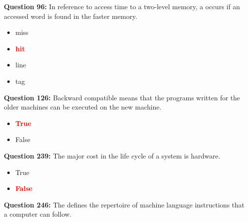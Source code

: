 \documentclass[12pt,a4paper]{article}
\begin{document}
\vspace{0.5cm}

\vspace{0.5cm}

\textbf{Question 96:} In reference to access time to a two-level memory, a \underline{\hspace{1.5cm}} occurs if an accessed word is found in the faster memory.

\begin{itemize}
    \item[\textbf{A.}] miss
    \item[\textbf{B.}] \textcolor{red}{\textbf{hit}}
    \item[\textbf{C.}] line
    \item[\textbf{D.}] tag
\end{itemize}

\vspace{0.5cm}

\vspace{0.5cm}

\textbf{Question 126:} Backward compatible means that the programs written for the older machines can be executed on the new machine.

\begin{itemize}
    \item[\textbf{A.}] \textcolor{red}{\textbf{True}}
    \item[\textbf{B.}] False
\end{itemize}

\vspace{0.5cm}

\vspace{0.5cm}

\textbf{Question 239:} The major cost in the life cycle of a system is hardware.

\begin{itemize}
    \item[\textbf{A.}] True
    \item[\textbf{B.}] \textcolor{red}{\textbf{False}}
\end{itemize}

\vspace{0.5cm}

\vspace{0.5cm}

\textbf{Question 246:} The \underline{\hspace{1.5cm}} defines the repertoire of machine language instructions that a computer can follow.
\end{document}
